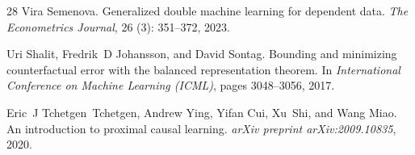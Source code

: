 \documentclass[twoside]{article}
\theoremstyle{definition}
\begin{document}
\begin{thebibliography}{28}
Vira Semenova.
\newblock Generalized double machine learning for dependent data.
\newblock \emph{The Econometrics Journal}, 26 (3): 351--372, 2023.

Uri Shalit, Fredrik~D Johansson, and David Sontag.
\newblock Bounding and minimizing counterfactual error with the balanced representation theorem.
\newblock In \emph{International Conference on Machine Learning (ICML)}, pages 3048--3056, 2017.

Eric~J Tchetgen~Tchetgen, Andrew Ying, Yifan Cui, Xu~Shi, and Wang Miao.
\newblock An introduction to proximal causal learning.
\newblock \emph{arXiv preprint arXiv:2009.10835}, 2020.
\end{thebibliography}

\clearpage
\end{document}

